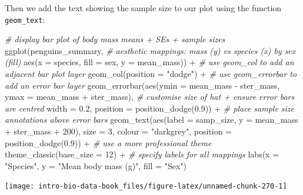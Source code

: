 \documentclass[
]{book}
\newenvironment{Shaded}{\begin{snugshade}}{\end{snugshade}}
\newcommand{\AttributeTok}[1]{\textcolor[rgb]{0.77,0.63,0.00}{#1}}
\newcommand{\CommentTok}[1]{\textcolor[rgb]{0.56,0.35,0.01}{\textit{#1}}}
\newcommand{\DecValTok}[1]{\textcolor[rgb]{0.00,0.00,0.81}{#1}}
\newcommand{\FloatTok}[1]{\textcolor[rgb]{0.00,0.00,0.81}{#1}}
\newcommand{\FunctionTok}[1]{\textcolor[rgb]{0.00,0.00,0.00}{#1}}
\newcommand{\NormalTok}[1]{#1}
\newcommand{\SpecialCharTok}[1]{\textcolor[rgb]{0.00,0.00,0.00}{#1}}
\newcommand{\StringTok}[1]{\textcolor[rgb]{0.31,0.60,0.02}{#1}}
\begin{document}
Then we add the text showing the sample size to our plot using the function \texttt{geom\_text}:

\begin{Shaded}
\begin{Highlighting}[]
\CommentTok{\# display bar plot of body mass means + SE\textquotesingle{}s + sample sizes}
\FunctionTok{ggplot}\NormalTok{(penguins\_summary, }
       \CommentTok{\# aesthetic mappings: mass (y) vs species (x) by sex (fill)}
       \FunctionTok{aes}\NormalTok{(}\AttributeTok{x =}\NormalTok{ species, }\AttributeTok{fill =}\NormalTok{ sex, }\AttributeTok{y =}\NormalTok{ mean\_mass)) }\SpecialCharTok{+} 
  \CommentTok{\# use geom\_col to add an adjacent bar plot layer}
  \FunctionTok{geom\_col}\NormalTok{(}\AttributeTok{position =} \StringTok{"dodge"}\NormalTok{) }\SpecialCharTok{+} 
  \CommentTok{\# use geom\_errorbar to add an error bar layer}
  \FunctionTok{geom\_errorbar}\NormalTok{(}\FunctionTok{aes}\NormalTok{(}\AttributeTok{ymin =}\NormalTok{ mean\_mass }\SpecialCharTok{{-}}\NormalTok{ ster\_mass, }\AttributeTok{ymax =}\NormalTok{ mean\_mass }\SpecialCharTok{+}\NormalTok{ ster\_mass),}
                \CommentTok{\# customise size of hat + ensure error bars are centred}
                \AttributeTok{width =} \FloatTok{0.2}\NormalTok{, }\AttributeTok{position =} \FunctionTok{position\_dodge}\NormalTok{(}\FloatTok{0.9}\NormalTok{)) }\SpecialCharTok{+} 
  \CommentTok{\# place sample size annotations above error bars}
  \FunctionTok{geom\_text}\NormalTok{(}\FunctionTok{aes}\NormalTok{(}\AttributeTok{label =}\NormalTok{ samp\_size, }\AttributeTok{y =}\NormalTok{ mean\_mass }\SpecialCharTok{+}\NormalTok{ ster\_mass }\SpecialCharTok{+} \DecValTok{200}\NormalTok{),}
            \AttributeTok{size =} \DecValTok{3}\NormalTok{, }\AttributeTok{colour =} \StringTok{"darkgrey"}\NormalTok{, }\AttributeTok{position =} \FunctionTok{position\_dodge}\NormalTok{(}\FloatTok{0.9}\NormalTok{)) }\SpecialCharTok{+} 
  \CommentTok{\# use a more professional theme }
  \FunctionTok{theme\_classic}\NormalTok{(}\AttributeTok{base\_size =} \DecValTok{12}\NormalTok{) }\SpecialCharTok{+} 
  \CommentTok{\# specify labels for all mappings}
  \FunctionTok{labs}\NormalTok{(}\AttributeTok{x =} \StringTok{"Species"}\NormalTok{, }\AttributeTok{y =} \StringTok{"Mean body mass (g)"}\NormalTok{, }\AttributeTok{fill =} \StringTok{"Sex"}\NormalTok{)}
\end{Highlighting}
\end{Shaded}

\begin{center}\texttt{[image: intro-bio-data-book\_files/figure-latex/unnamed-chunk-270-1]} \end{center}
\end{document}
